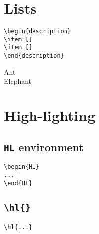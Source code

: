 \bigskip
\section{Lists}

\begin{SBN}
\color{blue}
\begin{verbatim}
\begin{description} 
\item [] 
\item []
\end{description}
\end{verbatim}
\end{SBN}

\begin{description} 
\item [Ant] \blindtext 
\item [Elephant] \blindtext 
\end{description}




\bigskip
\section{High-lighting} \label{sec:high-lighting}

\subsection{\texttt{HL} environment}
\begin{SBN}
\color{blue}
\begin{verbatim}
\begin{HL}
...
\end{HL}
\end{verbatim}
\end{SBN}

\begin{HL}
\lipsum[2]
\end{HL}

\subsection{\texttt{\textbackslash hl\{\}}}
\begin{SBN}
\color{blue}
\begin{verbatim}
\hl{...}
\end{verbatim}
\end{SBN}

